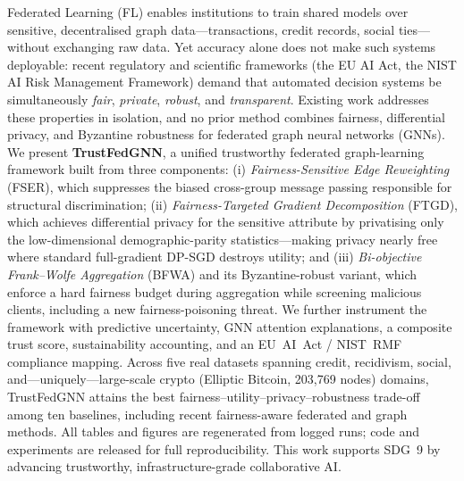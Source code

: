 Federated Learning (FL) enables institutions to train shared models over
sensitive, decentralised graph data---transactions, credit records, social
ties---without exchanging raw data. Yet accuracy alone does not make such
systems deployable: recent regulatory and scientific frameworks (the EU AI Act,
the NIST AI Risk Management Framework) demand that automated decision systems be
simultaneously \emph{fair}, \emph{private}, \emph{robust}, and
\emph{transparent}. Existing work addresses these properties in isolation, and
no prior method combines fairness, differential privacy, and Byzantine
robustness for federated graph neural networks (GNNs). We present
\textbf{TrustFedGNN}, a unified trustworthy federated graph-learning framework
built from three components: (i) \emph{Fairness-Sensitive Edge Reweighting}
(FSER), which suppresses the biased cross-group message passing responsible for
structural discrimination; (ii) \emph{Fairness-Targeted Gradient Decomposition}
(FTGD), which achieves differential privacy for the sensitive attribute by
privatising only the low-dimensional demographic-parity statistics---making
privacy nearly free where standard full-gradient DP-SGD destroys utility; and
(iii) \emph{Bi-objective Frank--Wolfe Aggregation} (BFWA) and its
Byzantine-robust variant, which enforce a hard fairness budget during
aggregation while screening malicious clients, including a new
fairness-poisoning threat. We further instrument the framework with predictive
uncertainty, GNN attention explanations, a composite trust score, sustainability
accounting, and an EU~AI~Act / NIST~RMF compliance mapping. Across five real
datasets spanning credit, recidivism, social, and---uniquely---large-scale
crypto (Elliptic Bitcoin, 203{,}769 nodes) domains, TrustFedGNN attains the best
fairness--utility--privacy--robustness trade-off among ten baselines, including
recent fairness-aware federated and graph methods. All tables and figures are
regenerated from logged runs; code and experiments are released for full
reproducibility. This work supports SDG~9 by advancing trustworthy,
infrastructure-grade collaborative AI.
